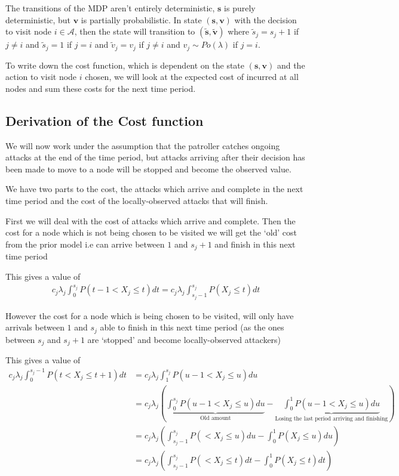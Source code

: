 \documentclass[a4paper,10pt]{article}
\theoremstyle{definition}
\theoremstyle{definition}
\theoremstyle{remark}
\theoremstyle{definition}
\begin{document}
The transitions of the MDP aren't entirely deterministic, $\bm{s}$ is purely deterministic, but $\bm{v}$ is partially probabilistic. In state $(\bm{s},\bm{v})$ with the decision to visit node $i \in \mathcal{A}$, then the state will transition to $(\widetilde{\bm{s}},\widetilde{\bm{v}})$ where $\widetilde{s}_{j}=s_{j}+1$ if $j \neq i$ and $\widetilde{s}_{j}=1$ if $j=i$ and $\widetilde{v}_{j}=v_{j}$ if $j \neq i$ and $v_{j} \sim Po(\lambda)$ if $j=i$.

To write down the cost function, which is dependent on the state $(\bm{s},\bm{v})$ and the action to visit node $i$ chosen, we will look at the expected cost of incurred at all nodes and sum these costs for the next time period.

\subsection{Derivation of the Cost function}
We will now work under the assumption that the patroller catches ongoing attacks at the end of the time period, but attacks arriving after their decision has been made to move to a node will be stopped and become the observed value.

We have two parts to the cost, the attacks which arrive and complete in the next time period and the cost of the locally-observed attacks that will finish.

First we will deal with the cost of attacks which arrive and complete. Then 
the cost for a node which is not being chosen to be visited we will get the `old' cost from the prior model i.e can arrive between $1$ and $s_{j}+1$ and finish in this next time period

This gives a value of
\begin{align*}
c_{j} \lambda_{j} \int_{0}^{s_{j}} P(t-1 < X_{j} \leq t) dt
=c_{j} \lambda_{j} \int_{s_{j}-1}^{s_{j}} P(X_{j} \leq t) dt
\end{align*}

However the cost for a node which is being chosen to be visited, will only have arrivals between $1$ and $s_{j}$ able to finish in this next time period (as the ones between $s_{j}$ and $s_{j}+1$ are `stopped' and become locally-observed attackers)

This gives a value of
\begin{align*}
c_{j} \lambda_{j} \int_{0}^{s_{j}-1} P(t < X_{j} \leq t+1) dt
&=c_{j} \lambda_{j} \int_{1}^{s_{j}} P(u-1 < X_{j} \leq u) du \\
&=c_{j} \lambda_{j} (\underbrace{\int_{0}^{s_{j}} P(u-1 < X_{j} \leq u) du}_{\text{Old amount}} - \underbrace{\int_{0}^{1} P(u-1 < X_{j} \leq u) du}_{\text{Losing the last period arriving and finishing}}) \\
&=c_{j} \lambda_{j} (\int_{s_{j}-1}^{s_{j}} P(< X_{j} \leq u) du - \int_{0}^{1} P(X_{j} \leq u) du) \\
&=c_{j} \lambda_{j} (\int_{s_{j}-1}^{s_{j}} P(< X_{j} \leq t) dt - \int_{0}^{1} P(X_{j} \leq t) dt)
\end{align*}
\end{document}
